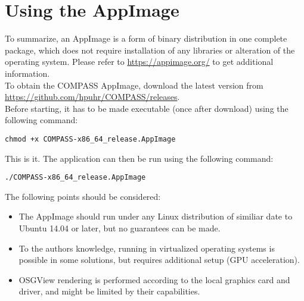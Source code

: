 \section{Using the AppImage}

To summarize, an AppImage is a form of binary distribution in one complete package, which does not require installation of any libraries or alteration of the operating system. 
Please refer to \url{https://appimage.org/} to get additional information. \\

To obtain the COMPASS AppImage, download the latest version from \url{https://github.com/hpuhr/COMPASS/releases}. \\

Before starting, it has to be made executable (once after download) using the following command:
\begin{lstlisting}
chmod +x COMPASS-x86_64_release.AppImage
\end{lstlisting}

This is it. The application can then be run using the following command:
\begin{lstlisting}
./COMPASS-x86_64_release.AppImage
\end{lstlisting}

The following points should be considered:

\begin{itemize}  
\item The AppImage should run under any Linux distribution of similiar date to Ubuntu 14.04 or later, but no guarantees can be made.
\item To the authors knowledge, running in virtualized operating systems is possible in some solutions, but requires additional setup (GPU acceleration).
\item OSGView rendering is performed according to the local graphics card and driver, and might be limited by their capabilities.
\end{itemize} 
